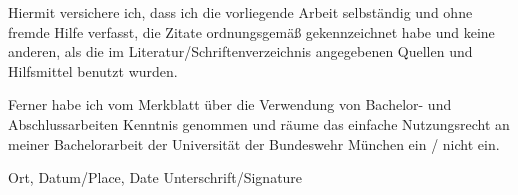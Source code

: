 \documentclass[a4paper,12pt]{scrartcl} %
\begin{document}
Hiermit versichere ich, dass ich die vorliegende Arbeit selbständig und ohne fremde Hilfe verfasst, die Zitate ordnungsgemäß gekennzeichnet habe und keine anderen, als die im Literatur/Schriftenverzeichnis angegebenen Quellen und Hilfsmittel benutzt wurden.

Ferner habe ich vom Merkblatt über die Verwendung von Bachelor- und Abschlussarbeiten Kenntnis genommen und räume das einfache Nutzungsrecht an meiner Bachelorarbeit der Universität der Bundeswehr München ein / nicht ein.

\vspace{3cm}
\makebox[\textwidth]{\hrulefill \hspace{3cm} \hrulefill}

Ort, Datum/Place, Date \hfill Unterschrift/Signature
\end{document}
